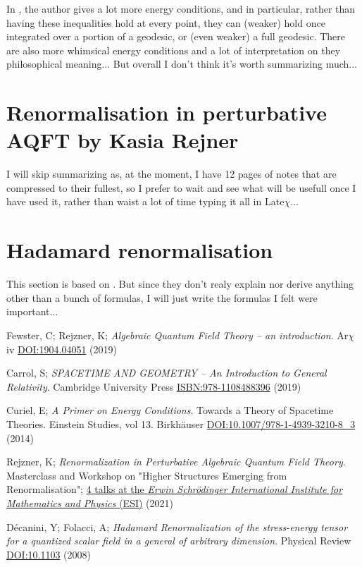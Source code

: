 \documentclass[a4paper,11pt]{article}
\numberwithin{equation}{section}
\theoremstyle{definition}
\begin{document}
In \cite{Primer}, the author gives a lot more energy conditions, and in particular, rather than having these inequalities hold at every point, they can (weaker) hold once integrated over a portion of a geodesic, or (even weaker) a full geodesic.
There are also more whimsical energy conditions and a lot of interpretation on they philosophical meaning... But overall I don't think it's worth summarizing much...

\section{Renormalisation in perturbative AQFT by Kasia Rejner}
I will skip summarizing \cite{RejConf} as, at the moment, I have 12 pages of notes that are compressed to their fullest, so I prefer to wait and see what will be usefull once I have used it, rather than waist a lot of time typing it all in Late$\chi$...

\section{Hadamard renormalisation}
This section is based on \cite{HadRen}. But since they don't realy explain nor derive anything other than a bunch of formulas, I will just write the formulas I felt were important...

\newpage
\begin{thebibliography}{99}

    Fewster, C; Rejzner, K; \textit{Algebraic Quantum Field Theory -- an introduction}. Ar$\chi$iv \href{https://arxiv.org/abs/1904.04051}{DOI:1904.04051} (2019)

    Carrol, S; \textit{SPACETIME AND GEOMETRY -- An Introduction to General Relativity}. Cambridge University Press \href{https://www.cambridge.org/highereducation/books/spacetime-and-geometry/38EDABF9E2BADCE6FBCF2B22DC12BFFE#overview}{ISBN:978-1108488396} (2019)

    Curiel, E; \textit{A Primer on Energy Conditions}. Towards a Theory of Spacetime Theories. Einstein Studies, vol 13. Birkhäuser \href{https://arxiv.org/abs/1405.0403}{DOI:10.1007/978-1-4939-3210-8\_3} (2014)

    Rejzner, K; \textit{Renormalization in Perturbative Algebraic Quantum Field Theory}. Masterclass and Workshop on "Higher Structures Emerging from Renormalisation"; \href{https://www.youtube.com/watch?v=3JVDJhFpuPY&ab_channel=ErwinSchr%C3%B6dingerInternationalInstituteforMathematicsandPhysics%28ESI%29}{4 talks at the \textit{Erwin Schrödinger International Institute for Mathematics and Physics} (ESI)} (2021)

    Décanini, Y; Folacci, A; \textit{Hadamard Renormalization of the stress-energy tensor for a quantized scalar field in a general of arbitrary dimension}. Physical Review \href{https://arxiv.org/abs/gr-qc/0512118}{DOI:10.1103} (2008)
     
        
\end{thebibliography}
\end{document}
